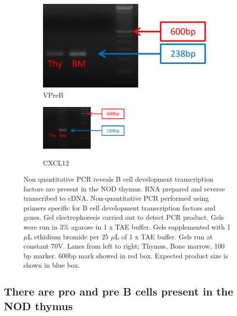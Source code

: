 \begin{figure}
\begin{subfigure}{0.5\textwidth}
	\end{subfigure}
	\begin{subfigure}{0.5\textwidth}
	\centering
	\caption{VPreB}
	\includegraphics[width=\textwidth]{Figures/VPreB.pdf}
	\end{subfigure}
	\begin{subfigure}{\textwidth}
	\caption{CXCL12}
	\includegraphics[width=0.5\textwidth]{Figures/CXCL12.pdf}
	\label{subfig:CXCL12}
	\end{subfigure}
\caption[Non quantitative PCR reveals B cell development transcription factors are present in the NOD thymus]{Non quantitative PCR reveals B cell development transcription factors are present in the NOD thymus.
RNA prepared and reverse transcribed to cDNA.
Non-quantitative PCR performed using primers specific for B cell development transcription factors and genes.
Gel electrophoresis carried out to detect PCR product.
Gels were run in 3\% agarose in 1 x TAE buffer. Gels supplemented with 1 $\mu$L ethidium bromide per 25 $\mu$L of 1 x TAE buffer. Gels run at constant 70V.
Lanes from left to right; Thymus, Bone marrow, 100 bp marker. 
600bp mark showed in red box.
Expected product size is shown in blue box.}
\label{fig:gels}
\end{figure}


\subsection{There are pro and pre B cells present in the NOD thymus}
\label{subsec:proandpre}

